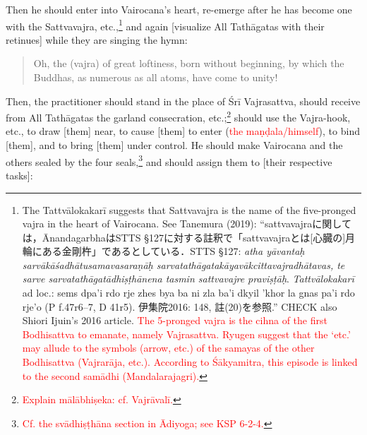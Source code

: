\documentclass[11pt]{book}
\newcommand{\red}[1]{\textcolor{red}{#1}}
\newcommand{\skt}[1]{\emph{#1}}
\begin{document}
Then he should enter into Vairocana's heart, re-emerge after he has become one with the Sattvavajra, etc.,\footnote{The Tattvālokakarī suggests that Sattvavajra is the name of the five-pronged vajra in the heart of Vairocana. See Tanemura (2019): ``sattvavajraに関しては，ĀnandagarbhaはSTTS §127に対する註釈で「sattvavajraとは[心臓の]月輪にある金剛杵」であるとしている．STTS §127: \skt{atha yāvantaḥ sarvākāśadhātusamavasaraṇāḥ sarvatathāgatakāyavākcittavajradhātavas, te sarve sarvatathāgatādhiṣṭhānena tasmin sattvavajre praviṣṭāḥ}. \textit{Tattvālokakarī} ad loc.: sems dpa'i rdo rje zhes bya ba ni zla ba'i dkyil 'khor la gnas pa'i rdo rje’o (P f.47r6–7, D 41r5). 伊集院2016: 148, 註(20)を参照.'' CHECK also Shiori Ijuin's 2016 article.
\red{The 5-pronged vajra is the cihna of the first Bodhisattva to emanate, namely Vajrasattva. Ryugen suggest that the `etc.' may allude to the symbols (arrow, etc.) of the samayas of the other Bodhisattva (Vajrarāja, etc.). According to Śākyamitra, this episode is linked to the second samādhi (Mandalarajagri).}} and again [visualize All Tathāgatas with their retinues] while they are singing the hymn:

\begin{verse}
Oh, the (vajra) of great loftiness, born without beginning, by which the Buddhas, as numerous as all atoms, have come to unity!
\end{verse}

Then, the practitioner should stand in the place of Śrī Vajrasattva, should receive from All Tathāgatas the garland consecration, etc.;\footnote{\red{Explain mālābhiṣeka: cf. Vajrāvalī.}} should use the Vajra-hook, etc., to draw [them] near, to cause [them] to enter (\red{the maṇḍala/himself}), to bind [them], and to bring [them] under control. He should make Vairocana and the others sealed by the four seals,\footnote{\red{Cf. the svādhiṣṭhāna section in Ādiyoga; see KSP 6-2-4.}} and should assign them to [their respective tasks]:
\end{document}
